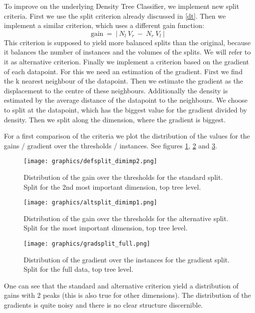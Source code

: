 \documentclass[draft]{article}
\begin{document}
To improve on the underlying Density Tree Classifier, we implement new split criteria.
First we use the split criterion already discussed in \ref{dt}. 
Then we implement a similar criterion, which uses a different gain function:
\begin{equation}
	\textrm{gain} ~  = ~ | ~ N_l ~ V_r ~ - ~ N_r ~ V_l ~ |
\end{equation}
This criterion is supposed to yield more balanced splits than the original, because it balances the 
number of instances and the volumes of the splits. We will refer to it as alternative criterion.
\newline
Finally we implement a criterion based on the gradient of each datapoint.
For this we need an estimation of the gradient. First we find the k nearest neighbour of
the datapoint. Then we estimate the gradient as the displacement to the centre of these neighbours.
Additionally the density is estimated by the average distance of the datapoint to the neighbours.
We choose to split at the datapoint, which has the biggest value for the gradient divided by density.
Then we split along the dimension, where the gradient is biggest.

For a first comparison of the criteria we plot the distribution of the values for the gains / gradient
over the thresholds / instances. See figures \ref{fig2a}, \ref{fig2b} and \ref{fig2c}.

\begin{figure}[h]
	\centering
	\texttt{[image: graphics/defsplit\_dimimp2.png]}
	\caption{Distribution of the gain over the thresholds for the standard split.
	Split for the 2nd most important dimension, top tree level.}
	\label{fig2a}
\end{figure}

\begin{figure}[h]
	\centering
	\texttt{[image: graphics/altsplit\_dimimp1.png]}
	\caption{Distribution of the gain over the thresholds for the alternative split.
	Split for the most important dimension, top tree level.}
	\label{fig2b}
\end{figure}

\begin{figure}[h]
	\centering
	\texttt{[image: graphics/gradsplit\_full.png]}
	\caption{Distribution of the gradient over the instances for the gradient split.
	Split for the full data, top tree level.}
	\label{fig2c}
\end{figure}

One can see that the standard and alternative criterion yield a distribution  
of gains with 2 peaks (this is also true for other dimensions).
The distribution of the gradients is quite noisy and there is no clear structure discernible.
\end{document}
